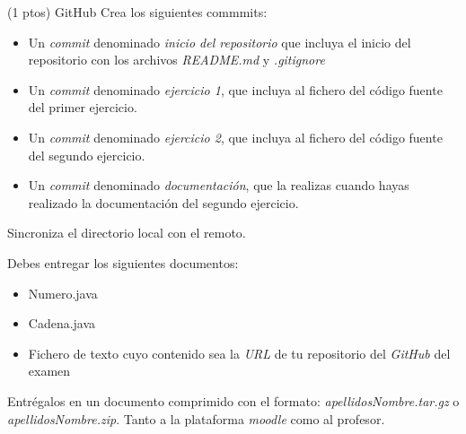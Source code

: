 \documentclass[addpoints,12pt]{exam}
\begin{document}
\begin{questions}
\vspace{0.5 cm}
\question (1 ptos) GitHub
Crea los siguientes commmits:
\begin{itemize}
\item Un \emph{commit} denominado \emph{inicio del repositorio} que incluya el inicio del repositorio con los archivos \emph{README.md} y \emph{.gitignore}
\item Un \emph{commit} denominado \emph{ejercicio 1}, que incluya al fichero del código fuente del primer ejercicio.
\item Un \emph{commit} denominado \emph{ejercicio 2}, que incluya al fichero del código fuente del segundo ejercicio.
\item Un \emph{commit} denominado \emph{documentación}, que la realizas cuando hayas realizado la documentación del segundo ejercicio.
\end{itemize}
Sincroniza el directorio local con el remoto.

\end{questions}
\newpage
\vspace{0,5cm}
Debes entregar los siguientes documentos:
\begin{itemize}
\item Numero.java
\item Cadena.java
\item Fichero de texto cuyo contenido sea la \emph{URL} de tu repositorio del \emph{GitHub} del examen
\end{itemize}

Entrégalos en un documento comprimido con el formato:\emph{ apellidosNombre.tar.gz} o \emph{apellidosNombre.zip}. Tanto a la plataforma \emph{moodle} como al profesor.
\end{document}
